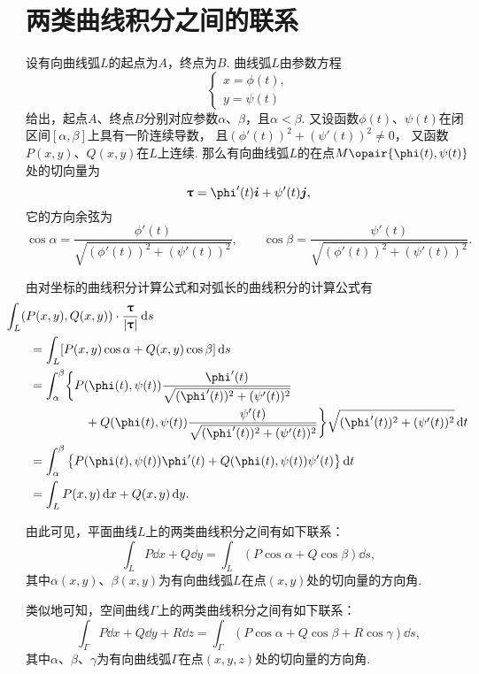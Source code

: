 \section{两类曲线积分之间的联系}
\begingroup
\def\innerProductTau{(\phi'(t))^2+(\psi'(t))^2}%
\def\lenTau{\sqrt{\innerProductTau}}%
\def\fTau#1{\frac{#1}{\lenTau}}%
\def\funcParam{(\phi(t),\psi(t))}%

设有向曲线弧\(L\)的起点为\(A\)，终点为\(B\).
曲线弧\(L\)由参数方程\[
	\begin{cases}
		x = \phi(t), \\
		y = \psi(t)
	\end{cases}
\]给出，起点\(A\)、终点\(B\)分别对应参数\(\alpha\)、\(\beta\)，且\(\alpha < \beta\).
又设函数\(\phi(t)\)、\(\psi(t)\)在闭区间\([\alpha,\beta]\)上具有一阶连续导数，
且\(\innerProductTau\neq0\)，
又函数\(P(x,y)\)、\(Q(x,y)\)在\(L\)上连续.
那么有向曲线弧\(L\)的在点\(M\opair{\phi(t),\psi(t)}\)处的切向量为\[
	\vb{\tau} = \phi'(t) \vb{i} + \psi'(t) \vb{j},
\]
它的方向余弦为\[
	\cos\alpha
	=\fTau{\phi'(t)},
	\qquad
	\cos\beta
	=\fTau{\psi'(t)}.
\]

由对坐标的曲线积分计算公式和对弧长的曲线积分的计算公式有
\begin{align*}
	&\hspace{-20pt}
	\int_L (P(x,y),Q(x,y))\cdot\frac{\vb{\tau}}{\abs{\vb{\tau}}}\dd{s} \\
	&=\int_L [P(x,y)\cos\alpha+Q(x,y)\cos\beta]\dd{s} \\
	&=\int_\alpha^\beta \biggl\{ {P\funcParam\fTau{\phi'(t)}} \\
		&\hspace{45pt}+{Q\funcParam\fTau{\psi'(t)}} \biggr\} \lenTau \dd{t} \\
	&=\int_\alpha^\beta \left\{
			P\funcParam\phi'(t) + Q\funcParam\psi'(t)
		\right\} \dd{t} \\
	&=\int_L{P(x,y)\dd{x}+Q(x,y)\dd{y}}.
\end{align*}
\endgroup

由此可见，平面曲线\(L\)上的两类曲线积分之间有如下联系：
\begin{equation}\label{equation:线积分与面积分.平面曲线上两类曲线积分之间的联系}
	\int_L P\dd{x}+Q\dd{y}
	=\int_L (P\cos\alpha+Q\cos\beta)\dd{s},
\end{equation}
其中\(\alpha(x,y)\)、\(\beta(x,y)\)为有向曲线弧\(L\)在点\((x,y)\)处的切向量的方向角.

类似地可知，空间曲线\(\Gamma\)上的两类曲线积分之间有如下联系：
\begin{equation}\label{equation:线积分与面积分.空间曲线上两类曲线积分之间的联系}
	\int_\Gamma P\dd{x}+Q\dd{y}+R\dd{z}
	=\int_\Gamma (P\cos\alpha+Q\cos\beta+R\cos\gamma)\dd{s},
\end{equation}
其中\(\alpha\)、\(\beta\)、\(\gamma\)为有向曲线弧\(\Gamma\)在点\((x,y,z)\)处的切向量的方向角.

